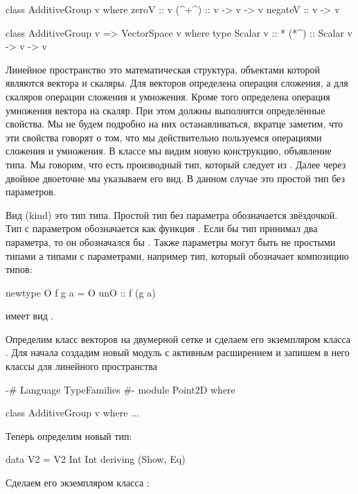 \begin{code}
class AdditiveGroup v where
    zeroV   :: v
    (^+^)   :: v -> v -> v
    negateV :: v -> v

class AdditiveGroup v => VectorSpace v where
    type Scalar v   :: *
    (*^)            :: Scalar v -> v -> v
\end{code}

Линейное пространство это математическая структура,
объектами которой являются вектора и скаляры. Для
векторов определена операция сложения, а для скаляров
операции сложения и умножения. Кроме того определена
операция умножения вектора на скаляр. При этом 
должны выполнятся определённые свойства.
Мы не будем подробно на них останавливаться, 
вкратце заметим, что эти свойства 
говорят о том, что мы действительно пользуемся 
операциями сложения и умножения.
В классе  мы видим новую конструкцию,
объявление типа. 
Мы говорим, что есть производный тип, который следует
из . Далее через двойное двоеточие мы указываем
его вид. В данном случае это простой тип без параметров.

Вид  (kind) это тип типа. Простой тип без параметра 
обозначается звёздочкой. Тип с параметром обозначается
как функция \In{* -> *}. Если бы тип принимал два параметра,
то он обозначался бы \In{* -> * -> *}. Также параметры
могут быть не простыми типами а типами с параметрами,
например тип, который обозначает композицию типов:

\begin{code}
newtype O f g a = O { unO :: f (g a) }
\end{code}

\noindent имеет вид \In{(* -> *) -> (* -> *) -> * -> *}.

Определим класс векторов на двумерной сетке и сделаем
его экземпляром класса . Для начала
создадим новый модуль с активным расширением 
и запишем в него классы для линейного пространства

\begin{code}
{-# Language TypeFamilies #-}
module Point2D where

class AdditiveGroup v where
...
\end{code}

Теперь определим новый тип:

\begin{code}
data V2 = V2 Int Int
    deriving (Show, Eq)
\end{code}

Сделаем его экземпляром класса :

